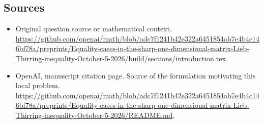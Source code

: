 \documentclass[11pt]{article}
\begin{document}
\subsection{Sources}
\begin{itemize}
\item[S1] Original question source or mathematical context.
\url{https://github.com/openai/math/blob/adc7f1241b42e322a6451854ab7e4b4c146bf78a/preprints/Equality-cases-in-the-sharp-one-dimensional-matrix-Lieb-Thirring-inequality-October-5-2026/build/sections/introduction.tex}.
\item[S2] OpenAI, manuscript citation page. Source of the formulation motivating this local problem.
\url{https://github.com/openai/math/blob/adc7f1241b42e322a6451854ab7e4b4c146bf78a/preprints/Equality-cases-in-the-sharp-one-dimensional-matrix-Lieb-Thirring-inequality-October-5-2026/README.md}.
\end{itemize}
\end{document}
